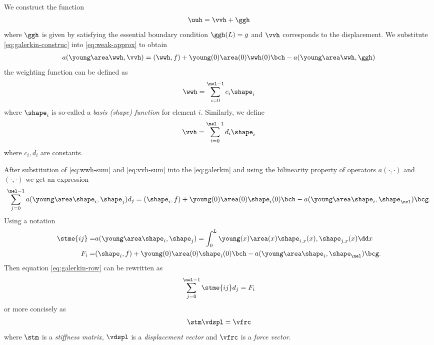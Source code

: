 \documentclass[twoside,a4paper,12pt,draft]{article}
\begin{document}
We construct the function
\begin{align}
  \uuh  = \vvh + \ggh \label{eq:galerkin-construc}
\end{align}
%
where $\ggh$ is given by satisfying the essential boundary condition
$\ggh(L) = g$ and $\vvh$ corresponds to the displacement. We
substitute \eqref{eq:galerkin-construc} into \eqref{eq:weak-approx} to
obtain
%
\begin{align}
  a(\young\area\wwh,\vvh) = (\wwh, f) + \young(0)\area(0)\wwh(0)\bch - 
  a(\young\area\wwh,\ggh)\label{eq:galerkin}
\end{align}
%
the weighting function can be defined as
%
\begin{align}
  \wwh = \sum_{i=0}^{\nel-1} c_i \shape_i \label{eq:wwh-sum}
\end{align}
%
where $\shape_i$ is so-called a \emph{basis (shape) function} for
element $i$. Similarly, we define
%
\begin{align}
  \vvh = \sum_{i=0}^{\nel-1} d_i \shape_i \label{eq:vvh-sum}
\end{align}
where $c_i, d_i$ are constants.

After substitution of \eqref{eq:wwh-sum} and \eqref{eq:vvh-sum} into
the \eqref{eq:galerkin} and using the bilinearity property of
operators $a(\cdot,\cdot)$ and $(\cdot,\cdot)$ we get an expression
%
\begin{align}
  \sum_{j=0}^{\nel-1} a(\young\area\shape_i, \shape_j) d_j = (\shape_i, f) + \young(0)\area(0)\shape_i(0) \bch - a(\young\area\shape_i,\shape_\nel)\bcg. \label{eq:galerkin-row}
\end{align}
%
Using a notation
%
\begin{subequations}
  \begin{align}
    \stme{ij} =& a(\young\area\shape_i,\shape_j) = \int_0^L \young(x)\area(x)\shape_{i,x}(x),\shape_{j,x}(x) \dd x \label{eq:stme} \\ 
    F_i =& (\shape_i,f) + \young(0)\area(0)\shape_i(0) \bch - a(\young\area\shape_i,\shape_{\nel}) \bcg .
  \end{align}\label{eq:fem-stme-fi}
\end{subequations}
%
Then equation \eqref{eq:galerkin-row} can be rewritten as
%
\begin{align}
  \sum_{j=0}^{\nel-1} \stme{ij} d_j = F_i
\end{align}
or more concisely as
\begin{align}
\stm \vdspl = \vfrc \label{eq:concise-eq}
\end{align}
where $\stm$ is a \emph{stiffness matrix}, $\vdspl$ is a
\emph{displacement vector} and $\vfrc$ is a \emph{force vector}.
\end{document}
